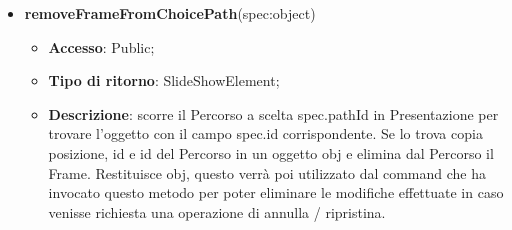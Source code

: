 {\begin{itemize}
\begin{itemize}
			\end{itemize}
			\item \textbf{removeFrameFromChoicePath}(spec:object)
			\begin{itemize}
				\item \textbf{Accesso}: Public;
				\item \textbf{Tipo di ritorno}: SlideShowElement;
				\item \textbf{Descrizione}: scorre il Percorso a scelta spec.pathId in Presentazione per trovare l’oggetto con il campo spec.id corrispondente. Se lo trova copia posizione, id e id del Percorso in un oggetto obj e elimina dal Percorso\ped{g} il Frame. Restituisce obj, questo verrà poi utilizzato dal command che ha invocato questo metodo per poter eliminare le modifiche effettuate in caso venisse richiesta una operazione di annulla / ripristina.
			\end{itemize}
		\end{itemize}
		
	}
